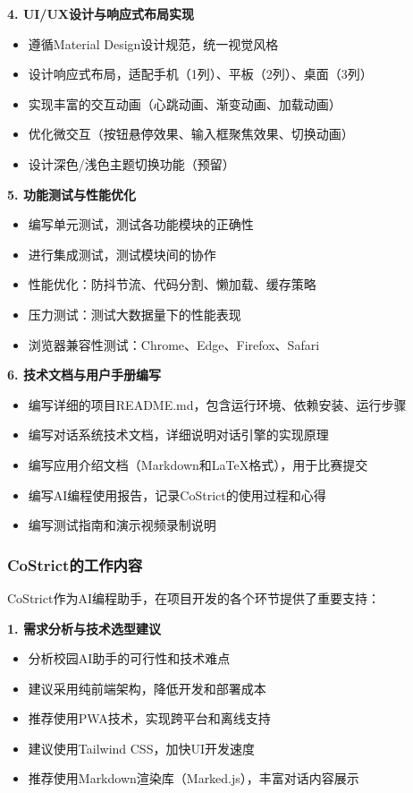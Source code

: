 \documentclass[12pt,a4paper]{article}
\begin{document}
\textbf{4. UI/UX设计与响应式布局实现}
\begin{itemize}
    \item 遵循Material Design设计规范，统一视觉风格
    \item 设计响应式布局，适配手机（1列）、平板（2列）、桌面（3列）
    \item 实现丰富的交互动画（心跳动画、渐变动画、加载动画）
    \item 优化微交互（按钮悬停效果、输入框聚焦效果、切换动画）
    \item 设计深色/浅色主题切换功能（预留）
\end{itemize}

\textbf{5. 功能测试与性能优化}
\begin{itemize}
    \item 编写单元测试，测试各功能模块的正确性
    \item 进行集成测试，测试模块间的协作
    \item 性能优化：防抖节流、代码分割、懒加载、缓存策略
    \item 压力测试：测试大数据量下的性能表现
    \item 浏览器兼容性测试：Chrome、Edge、Firefox、Safari
\end{itemize}

\textbf{6. 技术文档与用户手册编写}
\begin{itemize}
    \item 编写详细的项目README.md，包含运行环境、依赖安装、运行步骤
    \item 编写对话系统技术文档，详细说明对话引擎的实现原理
    \item 编写应用介绍文档（Markdown和LaTeX格式），用于比赛提交
    \item 编写AI编程使用报告，记录CoStrict的使用过程和心得
    \item 编写测试指南和演示视频录制说明
\end{itemize}

\subsubsection{CoStrict的工作内容}

CoStrict作为AI编程助手，在项目开发的各个环节提供了重要支持：

\textbf{1. 需求分析与技术选型建议}
\begin{itemize}
    \item 分析校园AI助手的可行性和技术难点
    \item 建议采用纯前端架构，降低开发和部署成本
    \item 推荐使用PWA技术，实现跨平台和离线支持
    \item 建议使用Tailwind CSS，加快UI开发速度
    \item 推荐使用Markdown渲染库（Marked.js），丰富对话内容展示
\end{itemize}
\end{document}
